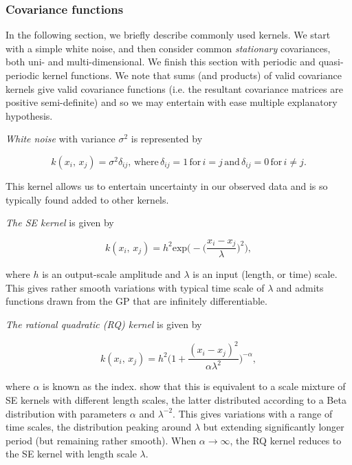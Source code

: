       \subsubsection{Covariance functions}

         \cite{Roberts2013} In the following section, we briefly describe commonly used kernels. We start with a simple white noise, and then consider common \textit{stationary} covariances, both uni- and multi-dimensional. We finish this section with periodic and quasi-periodic kernel functions. We note that sums (and products) of valid covariance kernels give valid covariance functions (i.e. the resultant covariance matrices are positive semi-definite) and so we may entertain with ease multiple explanatory hypothesis. 

         \vspace{1em}

         \textit{White noise} with variance \(\sigma^2\) is represented by
         
         \[k(x_{i}, \, x_{j}) = \sigma^2\delta_{ij}, \, \text{where} \, \delta_{ij} = 1 \, \text{for} \, i = j \, \text{and} \, \delta_{ij} = 0 \, \text{for} \, i \neq j.\]

         This kernel allows us to entertain uncertainty in our observed data and is so typically found added to other kernels.

         \vspace{1em}

         \textit{The SE kernel} is given by

         \[k(x_{i}, \, x_{j}) = h^{2} \text{exp} \bigg(- \Big(\frac{x_i - x_j}{\lambda} \Big)^2 \bigg),\]

         where \(h\) is an output-scale amplitude and \(\lambda\) is an input (length, or time) scale. This gives rather smooth variations with typical time scale of \(\lambda\) and admits functions drawn from the GP that are infinitely differentiable.

         \vspace{1em}

         \textit{The rational quadratic (RQ) kernel} is given by

         \[k(x_{i}, \, x_{j}) = h^{2} \bigg(1 + \frac{(x_{i} - x_{j})^2}{\alpha\lambda^2} \bigg)^{-\alpha},\]

         where \(\alpha\) is known as the index. \cite{Rasmussen2006} show that this is equivalent to a scale mixture of SE kernels with different length scales, the latter distributed according to a Beta distribution with parameters \(\alpha\) and \(\lambda^{-2}\). This gives variations with a range of time scales, the distribution peaking around \(\lambda\) but extending significantly longer period (but remaining rather smooth). When \(\alpha \to \infty\), the RQ kernel reduces to the SE kernel with length scale \(\lambda\).

